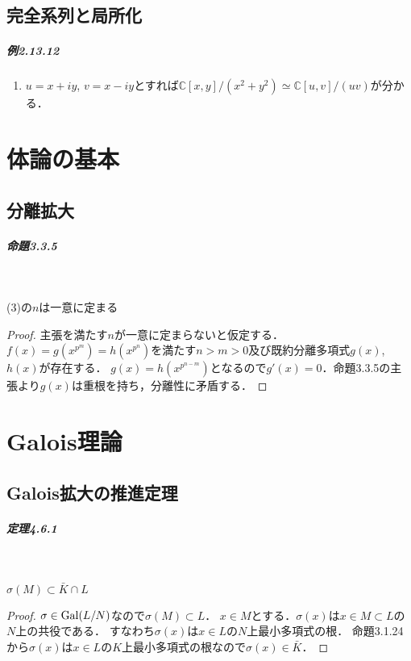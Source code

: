 \documentclass[a4paper]{ltjsreport}
\begin{document}
\section{完全系列と局所化}
\paragraph{例2.13.12}
\begin{enumerate}[label=(\arabic*)]
  \item \(u=x+iy\), \(v=x-iy\)とすれば\(\mathbb{C}[x,y]/(x^2+y^2) \simeq \mathbb{C}[u,v]/(uv)\)が分かる．
\end{enumerate}

\chapter{体論の基本}
\setcounter{section}{2}
\section{分離拡大}
\paragraph{命題3.3.5}~
\begin{screen}
  (3)の\(n\)は一意に定まる
\end{screen}
\begin{proof}
  主張を満たす\(n\)が一意に定まらないと仮定する．
  \(f(x) = g(x^{p^m}) = h(x^{p^n})\)を満たす\(n > m > 0\)及び既約分離多項式\(g(x)\), \(h(x)\)が存在する．
  \(g(x) = h(x^{p^{n-m}})\)となるので\(g'(x)=0\)．命題3.3.5の主張より\(g(x)\)は重根を持ち，分離性に矛盾する．
\end{proof}

\chapter{Galois理論}
\setcounter{section}{5}
\section{Galois拡大の推進定理}
\paragraph{定理4.6.1}~
\begin{screen}
  \(\sigma(M) \subset \bar{K} \cap L\)
\end{screen}
\begin{proof}
  \(\sigma \in \operatorname{Gal}(L/N)\)なので\(\sigma(M) \subset L\)．
  \(x\in M\)とする．\(\sigma(x)\)は\(x\in M\subset L\)の\(N\)上の共役である．
  すなわち\(\sigma(x)\)は\(x\in L\)の\(N\)上最小多項式の根．
  命題3.1.24から\(\sigma(x)\)は\(x\in L\)の\(K\)上最小多項式の根なので\(\sigma(x) \in \bar{K}\)．
\end{proof}
\end{document}
